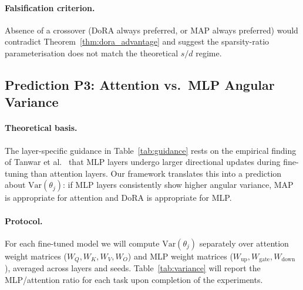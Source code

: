 \documentclass[11pt]{article}
\begin{document}
\paragraph{Falsification criterion.}
Absence of a crossover (DoRA always preferred, or MAP always preferred)
would contradict Theorem~\ref{thm:dora_advantage} and suggest the
sparsity-ratio parameterisation does not match the theoretical $s/d$ regime.

\subsection{Prediction P3: Attention vs.\ MLP Angular Variance}
\label{sec:alignment}

\paragraph{Theoretical basis.}
The layer-specific guidance in Table~\ref{tab:guidance} rests on the
empirical finding of Tanwar et al.~\cite{tanwar2025domain} that MLP
layers undergo larger directional updates during fine-tuning than
attention layers.
Our framework translates this into a prediction about
$\mathrm{Var}(\theta_j)$: if MLP layers consistently show higher angular
variance, MAP is appropriate for attention and DoRA is appropriate for MLP.

\paragraph{Protocol.}
For each fine-tuned model we will compute $\mathrm{Var}(\theta_j)$
separately over attention weight matrices ($W_Q, W_K, W_V, W_O$) and
MLP weight matrices ($W_{\mathrm{up}}, W_{\mathrm{gate}},
W_{\mathrm{down}}$), averaged across layers and seeds.
Table~\ref{tab:variance} will report the MLP/attention ratio for each
task upon completion of the experiments.
\end{document}
